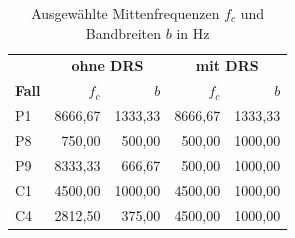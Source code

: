 \begin{table}[H]
  \centering
  \caption{Ausgewählte Mittenfrequenzen $f_c$ und Bandbreiten $b$ in Hz}
  \label{tab:ergebnisse_baender}
  \small
  \begin{tabular}{lrrrr}
    \hline
    & \multicolumn{2}{c}{\textbf{ohne DRS}} &
      \multicolumn{2}{c}{\textbf{mit DRS}} \\
    \textbf{Fall} & $f_c$ & $b$ & $f_c$ & $b$ \\
    \hline
    P1 & 8666,67 & 1333,33 & 8666,67 & 1333,33 \\
    P8 & 750,00 & 500,00 & 500,00 & 1000,00 \\
    P9 & 8333,33 & 666,67 & 500,00 & 1000,00 \\
    C1 & 4500,00 & 1000,00 & 4500,00 & 1000,00 \\
    C4 & 2812,50 & 375,00 & 4500,00 & 1000,00 \\
    \hline
  \end{tabular}
\end{table}
\par\clearpage
\endgroup
